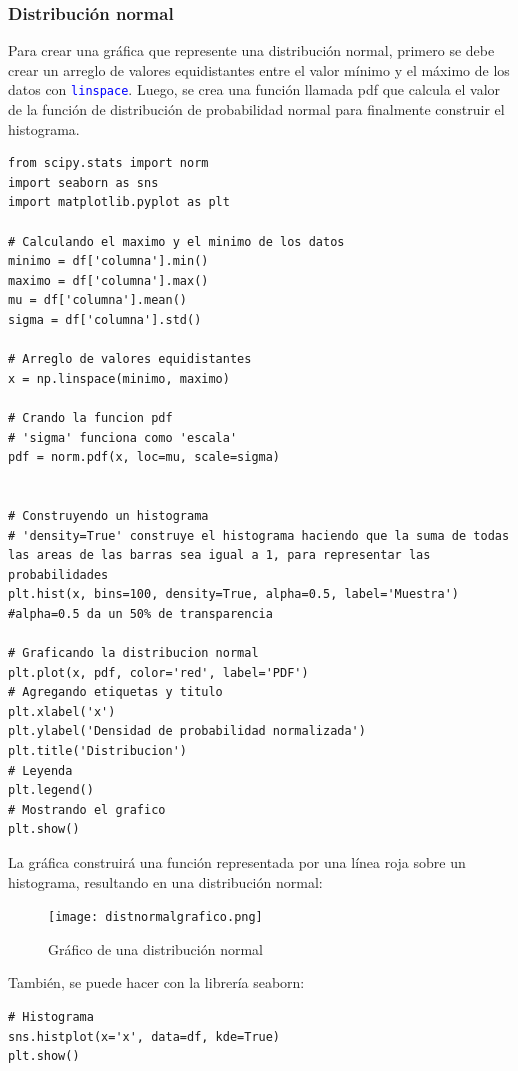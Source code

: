 \documentclass[a4paper, 12pt]{book}
\begin{document}
\subsubsection{Distribución normal}
Para crear una gráfica que represente una distribución normal, primero se debe crear un arreglo de valores equidistantes entre el valor mínimo y el máximo de los datos con \texttt{\textcolor{blue}{linspace}}. Luego, se crea una función llamada pdf que calcula el valor de la función de distribución de probabilidad normal para finalmente construir el histograma.
\begin{verbatim}
from scipy.stats import norm
import seaborn as sns
import matplotlib.pyplot as plt
	
# Calculando el maximo y el minimo de los datos
minimo = df['columna'].min()
maximo = df['columna'].max()
mu = df['columna'].mean()
sigma = df['columna'].std()

# Arreglo de valores equidistantes
x = np.linspace(minimo, maximo)
	
# Crando la funcion pdf
# 'sigma' funciona como 'escala'
pdf = norm.pdf(x, loc=mu, scale=sigma)
	
	
# Construyendo un histograma
# 'density=True' construye el histograma haciendo que la suma de todas las areas de las barras sea igual a 1, para representar las probabilidades
plt.hist(x, bins=100, density=True, alpha=0.5, label='Muestra') #alpha=0.5 da un 50% de transparencia
	
# Graficando la distribucion normal
plt.plot(x, pdf, color='red', label='PDF')
# Agregando etiquetas y titulo
plt.xlabel('x')
plt.ylabel('Densidad de probabilidad normalizada')
plt.title('Distribucion')
# Leyenda
plt.legend()
# Mostrando el grafico
plt.show()
\end{verbatim}
La gráfica construirá una función representada por una línea roja sobre un histograma, resultando en una distribución normal:
\begin{figure}[H] 
	\centering 
	\texttt{[image: distnormalgrafico.png]}
	\caption{Gráfico de una distribución normal}
\end{figure}
También, se puede hacer con la librería seaborn:
\begin{verbatim}
# Histograma
sns.histplot(x='x', data=df, kde=True)
plt.show()
\end{verbatim}

\end{document}
